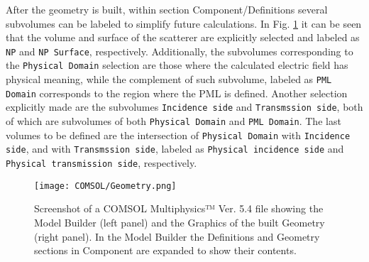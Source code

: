 After the geometry is built, within  section Component/Definitions several subvolumes can be labeled to simplify future calculations. In Fig. \ref{fig:COMSOL-Geo} it can be seen that the volume and surface of the scatterer are explicitly selected and labeled as \lstinline!NP! and \lstinline!NP Surface!, respectively. Additionally, the subvolumes corresponding to the \lstinline!Physical Domain! selection are those where the calculated electric field has physical meaning, while the complement of such subvolume, labeled as \lstinline!PML Domain! corresponds to the region where the PML is defined. Another selection explicitly made are the subvolumes \lstinline!Incidence side!  and \lstinline!Transmssion side!, both of which are subvolumes of both \lstinline!Physical Domain! and \lstinline!PML Domain!. The last volumes to be defined are the intersection of  \lstinline!Physical Domain! with \lstinline!Incidence side!, and with  \lstinline!Transmssion side!, labeled as \lstinline!Physical incidence side!  and \lstinline!Physical transmission side!, respectively.

\begin{figure}[t!]
    \centering
\texttt{[image: COMSOL/Geometry.png]}
\caption[COMSOl File Screenshot: Components/Definitions and Components/Geometry]{Screenshot of a COMSOL Multiphysics™ Ver. 5.4 file showing the Model Builder (left panel) and the Graphics of the built Geometry (right panel). In the Model Builder the Definitions and Geometry sections in Component are expanded to show their contents.}
\label{fig:COMSOL-Geo}
\end{figure}

